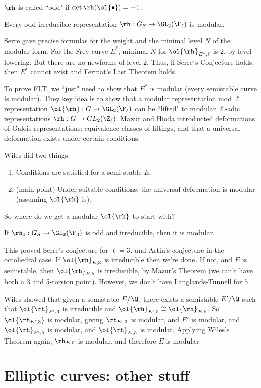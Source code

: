 $\rh$ is called ``odd" if $\det\rh(\ol{\bullet})=-1$.
\begin{conj}[Serre]
Every odd irreducible representation $\rh:G_S\to \GL_2(\F_{\ell})$ is modular.
\end{conj}
Serre gave precise formulas for the weight and the minimal level $N$ of the modular form. For the Frey curve $E^*$, minimal $N$ for $\ol{\rh}_{E^*,\ell}$ is 2, by level lowering. But there are no newforms of level 2. Thus, if Serre's Conjecture holds, then $E^*$ cannot exist and Fermat's Last Theorem holds.

To prove FLT, we ``just" need to show that $E^*$ is modular (every semistable curve is modular). They key idea is to show that a modular representation mod $\ell$ representation  $\ol{\rh}:G\to \GL_2(\F_{\ell})$ can be ``lifted" to modular $\ell$-adic representations $\rh:G\to GL_2(\Z_{\ell})$. Mazur and Hioda introducted deformations of Galois representations: equivalence classes of liftings, and that a universal deformation exists under certain conditions.

Wiles did two things.
\begin{enumerate}
\item
Conditions are satisfied for a semi-stable $E$.
\item
(main point) Under suitable conditions, the universal deformation is modular (assuming $\ol{\rh}$ is).
\end{enumerate}
So where do we get a modular $\ol{\rh}$ to start with? 
\begin{thm}
If $\rh_0:G_S\to \GL_2(\F_3)$ is odd and irreducible, then it is modular. 
\end{thm}
This proved Serre's conjecture for $\ell=3$, and Artin's conjecture in the octohedral case.
If $\ol{\rh}_{E,3}$ is irreducible then we're done. If not, and $E$ is semistable, then $\ol{\rh}_{E,5}$ is irreducible, by Mazur's Theorem (we can't have both a 3 and 5-torsion point). However, we don't have Langlands-Tunnell for $5$.

Wiles showed that given a semistable $E/\Q$, there exists a semistable $E'/\Q$ such that $\ol{\rh}_{E',3}$ is irreducible and $\ol{\rh}_{E',5}\cong \ol{\rh}_{E,5}$. So $\ol{\rh_{E',3}}$ is modular, giving $\rh_{E',3}$ is modular, and $E'$ is modular, and $\ol{\rh}_{E',5}$ is modular, and $\ol{\rh}_{E,5}$ is modular. Applying Wiles's Theorem again, $\rh_{E,5}$ is modular, and therefore $E$ is modular.
\chapter{Elliptic curves: other stuff}


